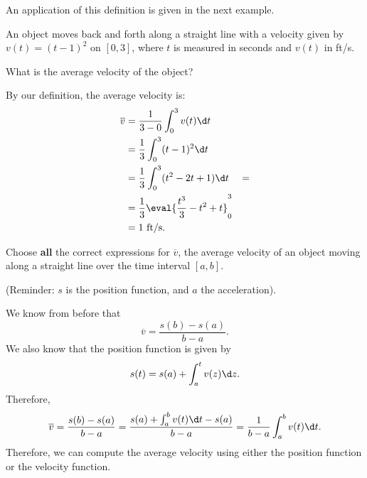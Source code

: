\documentclass{ximera}
\begin{document}
An application of this definition is given in the next example.


\begin{example}
An object moves back and forth along a straight line with a velocity
given by $v(t) = (t-1)^2$ on $[0,3]$, where $t$ is measured in seconds
and $v(t)$ in ft/s.

What is the average velocity of the object?
\begin{explanation}
By our definition, the average velocity is:
\begin{align*}
\overline{v}&=\frac{1}{3-0}\int_0^3v(t)\d t\\
&=\frac{1}{3}\int_0^3 (t-1)^2\d t \\
&=\frac13 \int_0^3 (t^2-2t+1)\d t&=\\
&= \frac13\eval{\frac{t^3}{3}-t^2+t}_0^3\\
&= 1\text{ ft/s}.
\end{align*}
\end{explanation}
\end{example}
\begin{question}
Choose \textbf{all} the correct expressions for $\overline{v}$, the average velocity of an object moving along a straight line over the time interval $[a,b]$.

(Reminder: $s$ is the position function, and $a$ the acceleration). 
\begin{selectAll}






\end{selectAll}
\begin{feedback}
We know from before that
\[
\overline{v}=\frac{s(b)-s(a)}{b-a}.
\]
We also know that the position function is given by
\[
s(t)=s(a)+\int_a^tv(z)\d z.
\]
Therefore,
\[
\overline{v}=\frac{s(b)-s(a)}{b-a}=\frac{s(a)+\int_a^bv(t)\d t-s(a)}{b-a}=\frac{1}{b-a}\int_a^bv(t)\d t.
\]
Therefore, we can compute the average velocity using either the position function or the velocity function.
\end{feedback}
\end{question}
\end{document}
